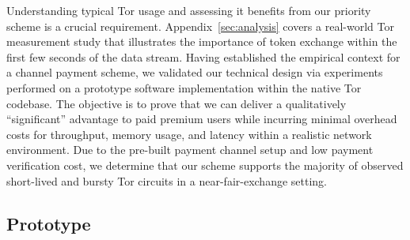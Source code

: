 Understanding typical Tor usage and assessing it benefits from our priority scheme is a crucial requirement.
Appendix~\ref{sec:analysis} covers a real-world Tor measurement study that illustrates the importance of token exchange within the first few seconds of the data stream.
Having established the empirical context for a channel payment scheme, we validated our technical design via experiments performed on a prototype software implementation within the native Tor codebase.
The objective is to prove that we can deliver a qualitatively ``significant'' advantage to paid premium users while incurring minimal overhead costs for throughput, memory usage, and latency within a realistic network environment.
Due to the pre-built payment channel setup and low payment verification cost, we determine that our scheme supports the majority of observed short-lived and bursty Tor circuits in a near-fair-exchange setting.

\subsection{Prototype}

